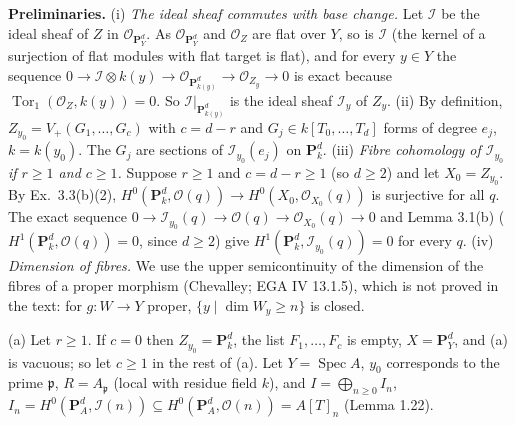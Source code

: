\documentclass[11pt]{article}
\begin{document}
\textbf{Preliminaries.} (i) \emph{The ideal sheaf commutes with base change.} Let $\mathcal I$ be the ideal sheaf of $Z$ in $\mathcal O_{\mathbf P^d_Y}$. As $\mathcal O_{\mathbf P^d_Y}$ and $\mathcal O_Z$ are flat over $Y$, so is $\mathcal I$ (the kernel of a surjection of flat modules with flat target is flat), and for every $y\in Y$ the sequence $0\to\mathcal I\otimes k(y)\to\mathcal O_{\mathbf P^d_{k(y)}}\to\mathcal O_{Z_y}\to0$ is exact because $\operatorname{Tor}_1(\mathcal O_Z,k(y))=0$. So $\mathcal I|_{\mathbf P^d_{k(y)}}$ is the ideal sheaf $\mathcal I_y$ of $Z_y$.
(ii) By definition, $Z_{y_0}=V_+(G_1,\dots,G_c)$ with $c=d-r$ and $G_j\in k[T_0,\dots,T_d]$ forms of degree $e_j$, $k=k(y_0)$. The $G_j$ are sections of $\mathcal I_{y_0}(e_j)$ on $\mathbf P^d_k$.
(iii) \emph{Fibre cohomology of $\mathcal I_{y_0}$ if $r\ge1$ and $c\ge1$.} Suppose $r\ge1$ and $c=d-r\ge1$ (so $d\ge2$) and let $X_0=Z_{y_0}$. By Ex.~3.3(b)(2), $H^0(\mathbf P^d_k,\mathcal O(q))\to H^0(X_0,\mathcal O_{X_0}(q))$ is surjective for all $q$. The exact sequence $0\to\mathcal I_{y_0}(q)\to\mathcal O(q)\to\mathcal O_{X_0}(q)\to0$ and Lemma 3.1(b) ($H^1(\mathbf P^d_k,\mathcal O(q))=0$, since $d\ge2$) give $H^1(\mathbf P^d_k,\mathcal I_{y_0}(q))=0$ for every $q$.
(iv) \emph{Dimension of fibres.} We use the upper semicontinuity of the dimension of the fibres of a proper morphism (Chevalley; EGA IV 13.1.5), which is not proved in the text: for $g:W\to Y$ proper, $\{y\mid\dim W_y\ge n\}$ is closed.

(a) Let $r\ge1$. If $c=0$ then $Z_{y_0}=\mathbf P^d_k$, the list $F_1,\dots,F_c$ is empty, $X=\mathbf P^d_Y$, and (a) is vacuous; so let $c\ge1$ in the rest of (a). Let $Y=\operatorname{Spec}A$, $y_0$ corresponds to the prime $\mathfrak p$, $R=A_{\mathfrak p}$ (local with residue field $k$), and $I=\bigoplus_{n\ge0}I_n$, $I_n=H^0(\mathbf P^d_A,\mathcal I(n))\subseteq H^0(\mathbf P^d_A,\mathcal O(n))=A[T]_n$ (Lemma 1.22).
\end{document}
